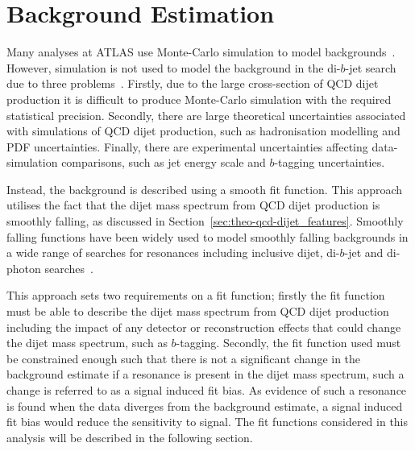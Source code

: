 


\section{Background Estimation}
\label{sec:bkg-fit}

Many analyses at ATLAS use Monte-Carlo simulation
to model backgrounds~\cite{obj-Hbb}.
However, simulation is not used to model the
background in the di-$b$-jet search due to three problems~\cite{theo-dijet_harris}.
Firstly, due to the large cross-section of QCD dijet production it is difficult to produce Monte-Carlo simulation with the required statistical precision.
Secondly, there are large theoretical uncertainties associated with simulations of QCD dijet production,
such as hadronisation modelling and PDF uncertainties.
Finally, there are experimental uncertainties affecting
data-simulation comparisons, such as jet energy scale and $b$-tagging uncertainties.

Instead, the background is described using a smooth fit function.
This approach utilises the fact that the dijet mass spectrum
from QCD dijet production is smoothly falling,
as discussed in Section~\ref{sec:theo-qcd-dijet_features}.
Smoothly falling functions have been widely used to model smoothly falling backgrounds in a wide range of searches for resonances
including inclusive dijet, di-$b$-jet and di-photon searches~\cite{dijet-mori16_paper,dibjet-mori16_paper,bkg-higgs_gammagamma}.

This approach sets two requirements on a fit function;
firstly the fit function must be able to describe the dijet mass spectrum from QCD dijet production
including the impact of any detector or reconstruction effects that could change the dijet mass spectrum, such as $b$-tagging.
Secondly, the fit function used must be constrained enough such that there is not a
significant change in the background estimate if a resonance is present in the dijet mass spectrum,
such a change is referred to as a signal induced fit bias.
As evidence of such a resonance is found when the data diverges from the background estimate,
a signal induced fit bias would reduce the sensitivity to signal.
The fit functions considered in this analysis will be described in the following section.

